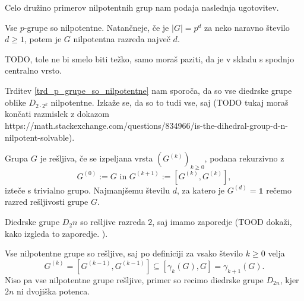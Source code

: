 \documentclass[mat1, tisk]{fmfdelo}
\numberwithin{equation}{section}  %
\begin{document}
Celo družino primerov nilpotentnih grup nam podaja naslednja ugotovitev.

\begin{trditev}
\label{trd_p_grupe_so_nilpotentne}
    Vse $p$-grupe so nilpotentne. Natančneje, če je $\lvert G \rvert  = p^{d}$ za neko naravno število $d \ge 1$, potem je $G$ nilpotentna razreda največ $d$. 
\end{trditev}
\begin{dokaz}
    TODO, tole ne bi smelo biti težko, samo moraš paziti, da je v skladu s spodnjo centralno vrsto.
\end{dokaz}

\begin{primer}
Trditev \ref{trd_p_grupe_so_nilpotentne} nam sporoča, da so vse diedrske grupe oblike $D_{2 \cdot 2^{k}}$ nilpotentne. Izkaže se, da so to tudi vse, saj (TODO tukaj moraš končati razmislek z dokazom https://math.stackexchange.com/questions/834966/is-the-dihedral-group-d-n-nilpotent-solvable). 
\end{primer}

\begin{definicija}
    \label{def_resljiva_grupa}
    Grupa $G$ je rešljiva, če se izpeljana vrsta $(G^{(k)})_{k \ge 0}$, podana rekurzivno z \begin{equation*}
        G^{(0)} := G \text{ in } G^{(k + 1)} := [G^{(k)}, G^{(k)}],
        \end{equation*}  
        izteče s trivialno grupo. Najmanjšemu številu $d$, za katero je $G^{(d)} = \mathbf{1}$ rečemo razred rešljivosti grupe $G$.    
    \end{definicija}
    
    \begin{primer}
    Diedrske grupe $D_2n$ so rešljive razreda $2$, saj imamo zaporedje (TOOD dokaži, kako izgleda to zaporedje. ).  %
    \end{primer}
    
    \begin{primer}
        Vse nilpotentne grupe so rešljive, saj po definiciji za vsako število $k \ge 0$ velja \begin{equation*}
        G^{(k)} = [G^{(k-1)}, G^{(k-1)}] \subseteq  [\gamma_k(G), G] = \gamma_{k +1}(G).
        \end{equation*}
        Niso pa vse nilpotentne grupe rešljive, primer so recimo diedrske grupe $D_{2n}$, kjer $2n$ ni dvojiška potenca. 
    \end{primer}
    
\end{document}

